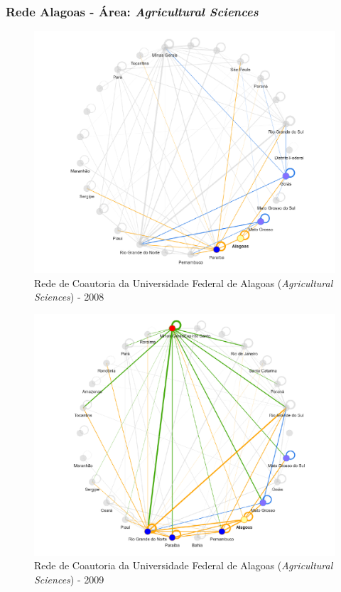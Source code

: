 \subsubsection{Rede Alagoas - Área: \textit{Agricultural Sciences}}

\begin{figure}[H]
	\centering
	\includegraphics[scale=0.6]{Imagens/rede-agr-AL-2008.pdf}
	\caption{Rede de Coautoria da Universidade Federal de Alagoas (\textit{Agricultural Sciences}) - 2008}
	\label{Rede de Coautoria - UF AGRI AL 2008}
\end{figure}

\begin{figure}[H]
	\centering
	\includegraphics[scale=0.6]{Imagens/rede-agr-AL-2009.pdf}
	\caption{Rede de Coautoria da Universidade Federal de Alagoas (\textit{Agricultural Sciences}) - 2009}
	\label{Rede de Coautoria - UF AGRI AL 2009}
\end{figure}

